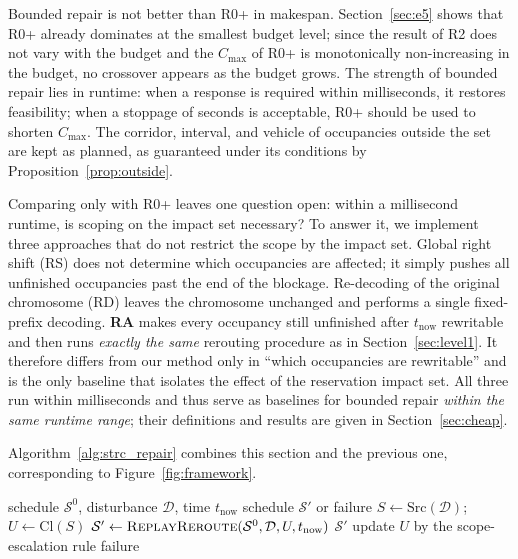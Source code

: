 Bounded repair is not better than R0+ in makespan. Section~\ref{sec:e5} shows that R0+ already dominates at the smallest budget level;
since the result of R2 does not vary with the budget and the \(C_{\max}\) of R0+ is monotonically non-increasing in the budget, no crossover appears as the budget grows.
The strength of bounded repair lies in runtime: when a response is required within milliseconds, it restores feasibility; when a stoppage of seconds is acceptable, R0+ should be used to shorten \(C_{\max}\).
The corridor, interval, and vehicle of occupancies outside the set are kept as planned, as guaranteed under its conditions by Proposition~\ref{prop:outside}.

Comparing only with R0+ leaves one question open: within a millisecond runtime, is scoping on the impact set necessary?
To answer it, we implement three approaches that do not restrict the scope by the impact set. Global right shift (RS) does not determine which occupancies
are affected; it simply pushes all unfinished occupancies past the end of the blockage. Re-decoding of the original chromosome (RD) leaves the chromosome unchanged and performs a single fixed-prefix decoding.
\textbf{RA} makes every occupancy still unfinished after \(t_{\mathrm{now}}\) rewritable and then runs \emph{exactly the same} rerouting procedure as in Section~\ref{sec:level1}.
It therefore differs from our method only in ``which occupancies are rewritable'' and is the only baseline that isolates the effect of the reservation impact set.
All three run within milliseconds and thus serve as baselines for bounded repair \emph{within the same runtime range};
their definitions and results are given in Section~\ref{sec:cheap}.

Algorithm~\ref{alg:strc_repair} combines this section and the previous one, corresponding to Figure~\ref{fig:framework}.

\begin{algorithm}[t]
\caption{Bounded repair on the reservation impact set (level-1 rerouting + scope escalation)}
\label{alg:strc_repair}
\begin{algorithmic}[1]
\Require schedule \(\mathcal{S}^0\), disturbance \(\mathcal{D}\), time \(t_{\mathrm{now}}\)
\Ensure schedule \(\mathcal{S}'\) or failure
\State \(S \gets \mathrm{Src}(\mathcal{D})\);
      \(U \gets \mathrm{Cl}(S)\)
  \State \(\mathcal{S}' \gets \textsc{ReplayReroute}(\mathcal{S}^0,\mathcal{D},U,t_{\mathrm{now}})\)
    \State \Return \(\mathcal{S}'\)
  \EndIf
  \State update \(U\) by the scope-escalation rule 
\EndFor
\State \Return failure
\end{algorithmic}
\end{algorithm}


